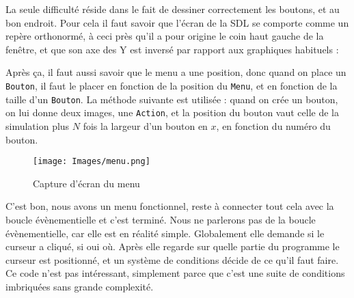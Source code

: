 	La seule difficulté réside dans le fait de dessiner correctement les boutons, et au bon endroit. Pour cela il faut savoir que l'écran de la SDL se comporte comme un repère orthonormé, à ceci près qu'il a pour origine le coin haut gauche de la fenêtre, et que son axe des Y est inversé par rapport aux graphiques habituels : 
	
	Après ça, il faut aussi savoir que le menu a une position, donc quand on place un \texttt{Bouton}, il faut le placer en fonction de la position du \texttt{Menu}, et en fonction de la taille d'un \texttt{Bouton}. La méthode suivante est utilisée : quand on crée un bouton, on lui donne deux images, une \texttt{Action}, et la position du bouton vaut celle de la simulation plus $N$ fois la largeur d'un bouton en $x$, en fonction du numéro du bouton.
	
	\begin{figure}[H]
	\centering
	\texttt{[image: Images/menu.png]}
	\caption{Capture d'écran du menu}
\end{figure}
	
	C'est bon, nous avons un menu fonctionnel, reste à connecter tout cela avec la boucle évènementielle et c'est terminé. Nous ne parlerons pas de la boucle évènementielle, car elle est en réalité simple. Globalement elle demande si le curseur a cliqué, si oui où. Après elle regarde sur quelle partie du programme le curseur est positionné, et un système de conditions décide de ce qu'il faut faire. Ce code n'est pas intéressant, simplement parce que c'est une suite de conditions imbriquées sans grande complexité.
